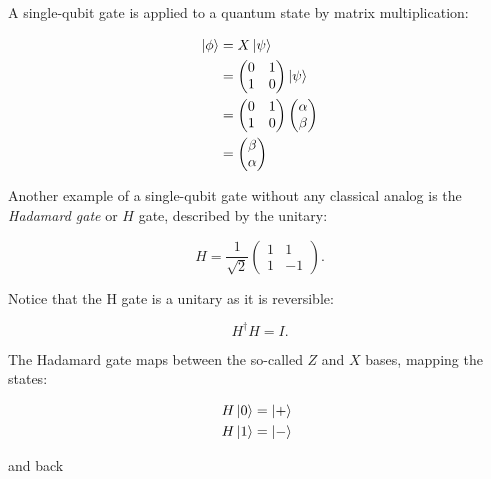 A single-qubit gate is applied to a quantum state by matrix multiplication:

\begin{align}
  \Ket{\phi} &= X \Ket{\psi} \\
             &=
               \begin{pmatrix}
                 0 & 1 \\
                 1 & 0
               \end{pmatrix}
                \Ket{\psi} \\
             &= \begin{pmatrix}
                 0 & 1 \\
                 1 & 0
               \end{pmatrix}
                \begin{pmatrix}
                  \alpha \\
                  \beta
                \end{pmatrix} \\
             &= \begin{pmatrix}
                 \beta \\
                 \alpha
               \end{pmatrix}
\end{align}

Another example of a single-qubit gate without any classical analog is the
\textit{Hadamard gate} or $H$ gate, described by the unitary:

\begin{equation}
  H = \frac{1}{\sqrt{2}}
  \begin{pmatrix}
    1 & 1 \\
    1 & -1
  \end{pmatrix}.
\end{equation}

Notice that the H gate is a unitary as it is reversible:

\begin{equation}
   H^{\dagger} H = I.
\end{equation}

The Hadamard gate maps between the so-called $Z$ and $X$ bases, mapping the
states:

\begin{align}
  H \Ket{0} &= \Ket{+} \\
  H \Ket{1} &= \Ket{-} \phantom{.}
\end{align}

and back

